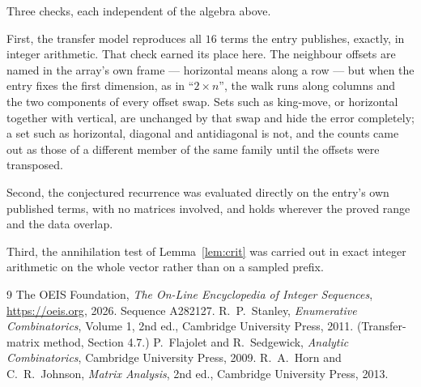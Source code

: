 \documentclass[11pt,a4paper]{article}
\theoremstyle{plain}
\theoremstyle{definition}
\begin{document}
Three checks, each independent of the algebra above.

First, the transfer model reproduces all $16$ terms the entry publishes, exactly, in
integer arithmetic. That check earned its place here. The neighbour offsets are named in the
array's own frame --- horizontal means along a row --- but when the entry fixes the first
dimension, as in ``$2\times n$'', the walk runs along columns and the two components of every
offset swap. Sets such as king-move, or horizontal together with vertical, are unchanged by
that swap and hide the error completely; a set such as horizontal, diagonal and antidiagonal
is not, and the counts came out as those of a different member of the same family until the
offsets were transposed.

Second, the conjectured recurrence was evaluated directly on the entry's own published terms,
with no matrices involved, and holds wherever the proved range and the data overlap.

Third, the annihilation test of Lemma~\ref{lem:crit} was carried out in exact integer
arithmetic on the whole vector rather than on a sampled prefix.

\begin{thebibliography}{9}
 The OEIS Foundation, \emph{The On-Line Encyclopedia of Integer
Sequences}, \url{https://oeis.org}, 2026. Sequence A282127.
 R.~P.~Stanley, \emph{Enumerative Combinatorics}, Volume 1, 2nd ed.,
Cambridge University Press, 2011. (Transfer-matrix method, Section 4.7.)
 P.~Flajolet and R.~Sedgewick, \emph{Analytic Combinatorics}, Cambridge
University Press, 2009.
 R.~A.~Horn and C.~R.~Johnson, \emph{Matrix Analysis}, 2nd ed., Cambridge
University Press, 2013.
\end{thebibliography}
\end{document}
